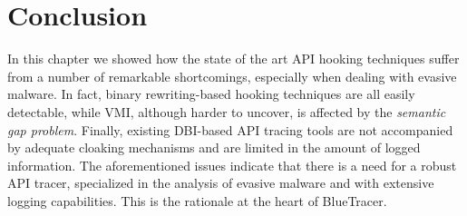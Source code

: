 \section{Conclusion}

In this chapter we showed how the state of the art API hooking techniques suffer from a number of remarkable shortcomings, especially when dealing with evasive malware. In fact, binary rewriting-based hooking techniques are all easily detectable, while VMI, although harder to uncover, is affected by the \textit{semantic gap problem}. Finally, existing DBI-based API tracing tools are not accompanied by adequate cloaking mechanisms and are limited in the amount of logged information. The aforementioned issues indicate that there is a need for a robust API tracer, specialized in the analysis of evasive malware and with extensive logging capabilities. This is the rationale at the heart of BlueTracer. 